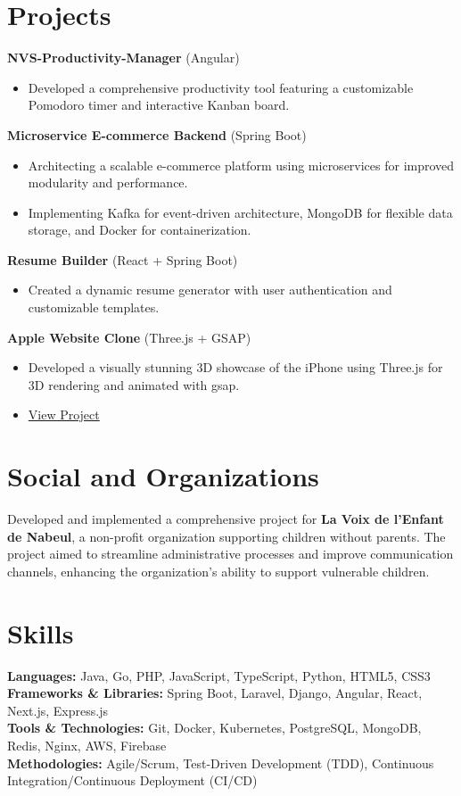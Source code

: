 \documentclass[11pt,letterpaper]{article}
\begin{document}
\section{Projects}
\textbf{NVS-Productivity-Manager} (Angular)
\begin{itemize}[leftmargin=*, itemsep=1pt]
    \item Developed a comprehensive productivity tool featuring a customizable Pomodoro timer and interactive Kanban board.
   
\end{itemize}

\textbf{Microservice E-commerce Backend} (Spring Boot)
\begin{itemize}[leftmargin=*, itemsep=1pt]
    \item Architecting a scalable e-commerce platform using microservices for improved modularity and performance.
    \item Implementing Kafka for event-driven architecture, MongoDB for flexible data storage, and Docker for containerization.
\end{itemize}

\textbf{Resume Builder} (React + Spring Boot)
\begin{itemize}[leftmargin=*, itemsep=1pt]
    \item Created a dynamic resume generator with user authentication and customizable templates.
\end{itemize}

\textbf{Apple Website Clone} (Three.js + GSAP)
\begin{itemize}[leftmargin=*, itemsep=1pt]
    \item Developed a visually stunning 3D showcase of the iPhone using Three.js for 3D rendering and animated with gsap.
    \item \href{https://apple-website-clone-3-d-animations.vercel.app/}{View Project}
\end{itemize}

\section{Social and Organizations}
Developed and implemented a comprehensive project for \textbf{La Voix de l'Enfant de Nabeul}, a non-profit organization supporting children without parents. The project aimed to streamline administrative processes and improve communication channels, enhancing the organization's ability to support vulnerable children.

\section{Skills}
\textbf{Languages:} Java, Go, PHP, JavaScript, TypeScript, Python, HTML5, CSS3\\
\textbf{Frameworks \& Libraries:} Spring Boot, Laravel, Django, Angular, React, Next.js, Express.js\\
\textbf{Tools \& Technologies:} Git, Docker, Kubernetes, PostgreSQL, MongoDB, Redis, Nginx, AWS, Firebase\\
\textbf{Methodologies:} Agile/Scrum, Test-Driven Development (TDD), Continuous Integration/Continuous Deployment (CI/CD)
\end{document}

